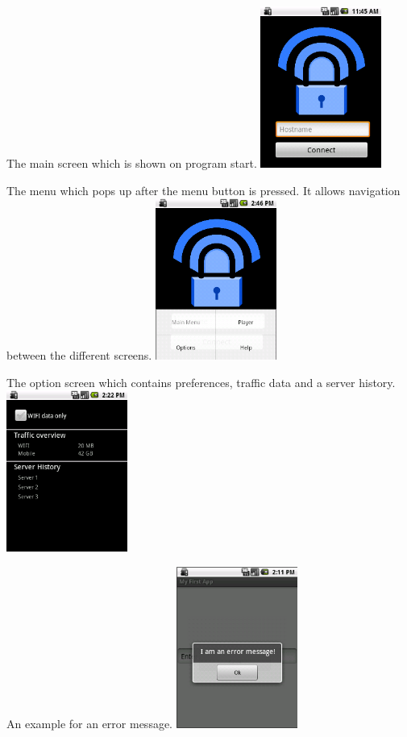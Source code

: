 \documentclass[a4paper,10pt]{scrartcl}
\begin{document}
\begin{illustration}{The main screen which is shown on program start.}
\includegraphics[width=150px]{figures/images/mainscreen.png}
\end{illustration}
\begin{illustration}{The menu which pops up after the menu button is pressed. It allows navigation between the different screens.}
\includegraphics[width=150px]{figures/images/menu.png}
\end{illustration}
\begin{illustration}{The option screen which contains preferences, traffic data and a server history.}
\includegraphics[width=150px]{figures/images/optionscreen.png}
\end{illustration}
\begin{illustration}{An example for an error message.}
\includegraphics[width=150px]{figures/images/error.png}
\end{illustration}
\end{document}
